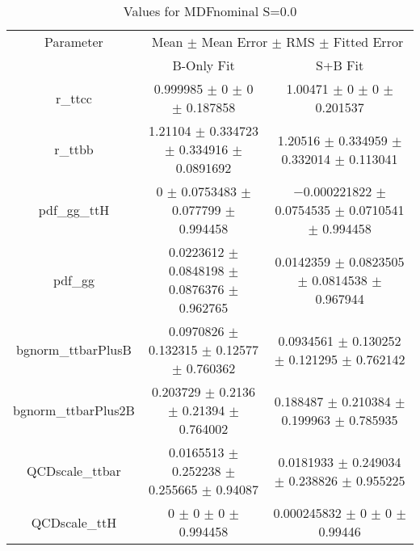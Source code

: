 \begin{table}
\centering
\caption{Values for MDFnominal S=0.0}
\begin{tabular}{ccc}
\toprule
Parameter & \multicolumn{2}{c}{Mean $\pm$ Mean Error $\pm$ RMS $\pm$ Fitted Error}\\
 & B-Only Fit & S+B Fit\\
\midrule
r\_ttcc & \num{0.999985} $\pm$ \num{0} $\pm$ \num{0} $\pm$ \num{0.187858} & \num{1.00471} $\pm$ \num{0} $\pm$ \num{0} $\pm$ \num{0.201537}\\
r\_ttbb & \num{1.21104} $\pm$ \num{0.334723} $\pm$ \num{0.334916} $\pm$ \num{0.0891692} & \num{1.20516} $\pm$ \num{0.334959} $\pm$ \num{0.332014} $\pm$ \num{0.113041}\\
pdf\_gg\_ttH & \num{0} $\pm$ \num{0.0753483} $\pm$ \num{0.077799} $\pm$ \num{0.994458} & \num{-0.000221822} $\pm$ \num{0.0754535} $\pm$ \num{0.0710541} $\pm$ \num{0.994458}\\
pdf\_gg & \num{0.0223612} $\pm$ \num{0.0848198} $\pm$ \num{0.0876376} $\pm$ \num{0.962765} & \num{0.0142359} $\pm$ \num{0.0823505} $\pm$ \num{0.0814538} $\pm$ \num{0.967944}\\
bgnorm\_ttbarPlusB & \num{0.0970826} $\pm$ \num{0.132315} $\pm$ \num{0.12577} $\pm$ \num{0.760362} & \num{0.0934561} $\pm$ \num{0.130252} $\pm$ \num{0.121295} $\pm$ \num{0.762142}\\
bgnorm\_ttbarPlus2B & \num{0.203729} $\pm$ \num{0.2136} $\pm$ \num{0.21394} $\pm$ \num{0.764002} & \num{0.188487} $\pm$ \num{0.210384} $\pm$ \num{0.199963} $\pm$ \num{0.785935}\\
QCDscale\_ttbar & \num{0.0165513} $\pm$ \num{0.252238} $\pm$ \num{0.255665} $\pm$ \num{0.94087} & \num{0.0181933} $\pm$ \num{0.249034} $\pm$ \num{0.238826} $\pm$ \num{0.955225}\\
QCDscale\_ttH & \num{0} $\pm$ \num{0} $\pm$ \num{0} $\pm$ \num{0.994458} & \num{0.000245832} $\pm$ \num{0} $\pm$ \num{0} $\pm$ \num{0.99446}\\
\bottomrule
\end{tabular}
\end{table}
